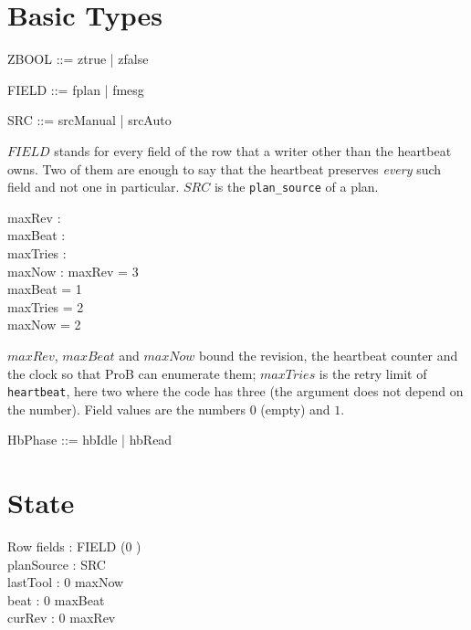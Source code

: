 \documentclass[a4paper,10pt,fleqn]{article}
\begin{document}
\section{Basic Types}

\begin{zed}
  ZBOOL ::= ztrue | zfalse
\end{zed}

\begin{zed}
  FIELD ::= fplan | fmesg
\end{zed}

\begin{zed}
  SRC ::= srcManual | srcAuto
\end{zed}

$FIELD$ stands for every field of the row that a writer other than the
heartbeat owns.  Two of them are enough to say that the heartbeat preserves
\emph{every} such field and not one in particular.  $SRC$ is the
\texttt{plan\_source} of a plan.

\begin{axdef}
  maxRev : \nat \\
  maxBeat : \nat \\
  maxTries : \nat \\
  maxNow : \nat
  \where
  maxRev = 3 \\
  maxBeat = 1 \\
  maxTries = 2 \\
  maxNow = 2
\end{axdef}

$maxRev$, $maxBeat$ and $maxNow$ bound the revision, the heartbeat counter and
the clock so that ProB can enumerate them; $maxTries$ is the retry limit of
\texttt{heartbeat}, here two where the code has three (the argument does not
depend on the number).  Field values are the numbers $0$ (empty) and $1$.

\begin{zed}
  HbPhase ::= hbIdle | hbRead
\end{zed}

\section{State}

\begin{schema}{Row}
  fields : FIELD \fun (0 ) \\
  planSource : SRC \\
  lastTool : 0 \upto maxNow \\
  beat : 0 \upto maxBeat \\
  curRev : 0 \upto maxRev
\end{schema}
\end{document}
